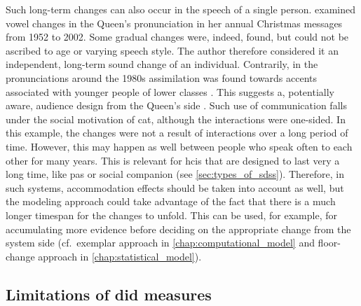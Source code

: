 Such long-term changes can also occur in the speech of a single person.
\citet{Harrington2007evidence} examined vowel changes in the Queen's pronunciation in her annual Christmas messages from 1952 to 2002.
Some gradual changes were, indeed, found, but could not be ascribed to age or varying speech style.
The author therefore considered it an independent, long-term sound change of an individual.
Contrarily, in the pronunciations around the 1980s assimilation was found towards accents associated with younger people of lower classes \citep{Harrington2000does, Harrington2000monophthongal}.
This suggests a, potentially aware, audience design from the Queen's side \citep{Bell1984language}.
Such use of communication falls under the social motivation of \ac{cat}, although the interactions were one-sided.
In this example, the changes were not a result of interactions over a long period of time.
However, this may happen as well between people who speak often to each other for many years.
This is relevant for \acp{hci} that are designed to last very a long time, like \acp{pa} or social companion (see \cref{sec:types_of_sdss}).
Therefore, in such systems, accommodation effects should be taken into account as well, but the modeling approach could take advantage of the fact that there is a much longer timespan for the changes to unfold.
This can be used, for example, for accumulating more evidence before deciding on the appropriate change from the system side (cf.\ exemplar approach in \cref{chap:computational_model} and floor-change approach in \cref{chap:statistical_model}).

\subsection{Limitations of \acl{did} measures}
\label{subsec:limitations_of_did}




